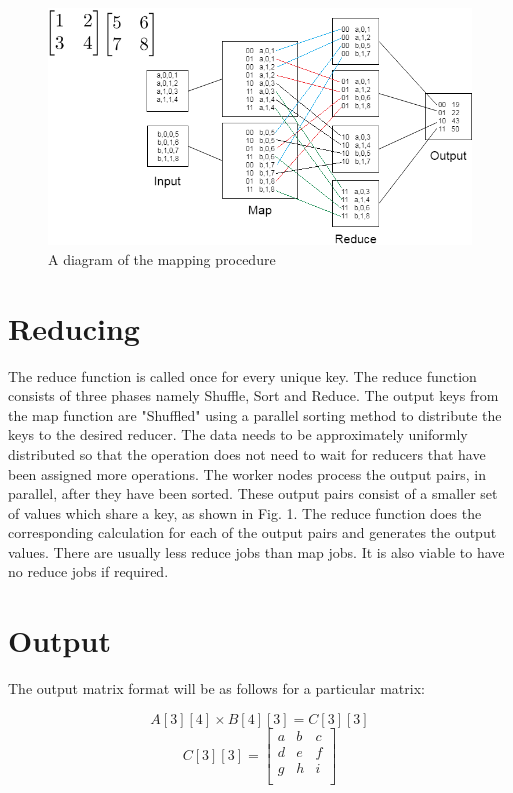 \documentclass[conference]{IEEEtran}
\begin{document}
\noindent
\begin{figure}[H]
\centering
\includegraphics[width =\linewidth]{MapReduce2.png}
\caption{A diagram of the mapping procedure}
\label{fig:circuit}
\end{figure}

\section{Reducing}

\noindent The reduce function is called once for every unique key. The reduce function consists of three phases namely Shuffle, Sort and Reduce. The output keys from the map function are "Shuffled" using a parallel sorting method to distribute the keys to the desired reducer. The data needs to be approximately uniformly distributed so that the operation does not need to wait for reducers that have been assigned more operations. The worker nodes process the output pairs, in parallel, after they have been sorted. These output pairs consist of a smaller set of values which share a key, as shown in Fig. 1. The reduce function does the corresponding calculation for each of the output pairs and generates the output values. There are usually less reduce jobs than map jobs. It is also viable to have no reduce jobs if required.\\ 

\section{Output}

\noindent The output matrix format will be as follows for a particular matrix:

\[A[3][4] \times B[4][3] = C[3][3]\] 
\begin{equation*}
C[3][3] =
\begin{bmatrix}
a       &b      &c\\
d       &e      &f\\
g       &h      &i\\
\end{bmatrix}
\end{equation*}
\end{document}
